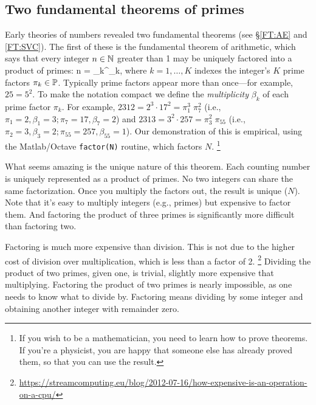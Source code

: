 \documentclass{ximera}
\begin{document}
\subsection{Two fundamental theorems of primes}
Early theories of numbers revealed two fundamental theorems (see \S\ref{FT:AE} and \ref{FT:SVC}). The first of these is
the fundamental theorem of arithmetic, which says that every integer $n\in\N$ greater than 1 may
be uniquely factored into a product of primes:
 \be
n =  \pi_k^{\beta_k},
\label{eq:PrimeFactors}
 \ee
where $k= 1,\ldots,K$ indexes the integer's $K$ prime factors $\pi_k\in\P$.
Typically prime factors appear more than once---for example, $25=5^2$. To make the notation compact
we define the \emph{multiplicity} $\beta_k$ of each prime factor $\pi_k$.  For example,
$2312 = 2^3 \cdot 17^2 = \pi_1^3 \; \pi_7^2 $ (i.e., $ \pi_1=2, \beta_1=3; \pi_7=17, \beta_{7}=2 $) and
$2313 = 3^2 \cdot 257 = \pi_3^2 \; \pi_{55} $ (i.e., $\pi_2=3, \beta_3=2; \pi_{55}=257, \beta_{55}=1$).
Our demonstration of this is empirical, using the Matlab/Octave \texttt{factor(N)} routine, which
factors $N$.%
 \footnote{If you wish to be a mathematician, you need to learn how to prove theorems.  If you're a
 physicist, you are happy that someone else has already proved them, so that you can use the result.}

What seems amazing is the unique nature of this theorem.  Each counting number is uniquely
represented as a product of primes. No two integers can share the same factorization.
Once you multiply the factors out, the result is unique ($N$). Note that it's easy to multiply
integers (e.g., primes) but expensive to factor them. And factoring the product of three primes
is significantly more difficult than factoring two.

Factoring is much more expensive than division. This is not due to the higher cost of division
over multiplication, which is less than a factor of 2.%
 \footnote{\scriptsize
\url{https://streamcomputing.eu/blog/2012-07-16/how-expensive-is-an-operation-on-a-cpu/}}
Dividing the product of two primes, given one, is trivial, slightly more expensive that multiplying.
Factoring the product of two primes is nearly impossible, as one needs to know what to divide by.
Factoring means dividing by some integer and obtaining another integer with remainder zero.
\end{document}
